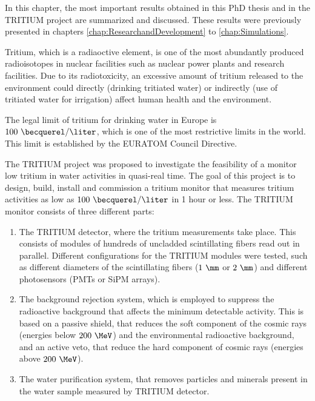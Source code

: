 In this chapter, the most important results obtained in this PhD thesis and in the TRITIUM project are summarized and discussed. These results were previously presented in chapters \ref{chap:ResearchandDevelopment} to \ref{chap:Simulations}.

Tritium, which is a radiaoctive element, is one of the most abundantly produced radioisotopes in nuclear facilities such as nuclear power plants and research facilities. Due to its radiotoxicity, an excessive amount of tritium released to the environment could directly (drinking tritiated water) or indirectly (use of tritiated water for irrigation) affect human health and the environment.

The legal limit of tritium for drinking water in Europe is $100~\becquerel/\liter$, which is one of the most restrictive limits in the world. This limit is established by the EURATOM Council Directive. %

The TRITIUM project was proposed to investigate the feasibility of a monitor 
low tritium in water activities in quasi-real time. The goal of this project is to design, build, install and commission a tritium monitor that measures tritium activities as low as $100~\becquerel/\liter$ in 1 hour or less. The TRITIUM monitor consists of three different parts:

\begin{enumerate}

\item{} The TRITIUM detector, where the tritium measurements take place. This consists of modules of hundreds of uncladded scintillating fibers read out in parallel. Different configurations for the TRITIUM modules were tested, such as different diameters of the scintillating fibers ($1~\mm$ or $2~\mm$) and different photosensors (PMTs or SiPM arrays).

\item{} The background rejection system, which is employed to suppress the radioactive background that affects the minimum detectable activity. This is based on a passive shield, that reduces the soft component of the cosmic rays (energies below $200~\MeV$) and the environmental radioactive background, and an active veto, that reduce the hard component of cosmic rays (energies above $200~\MeV$).

\item{} The water purification system, that removes particles and minerals present in the water sample measured by TRITIUM detector.

\end{enumerate} 

